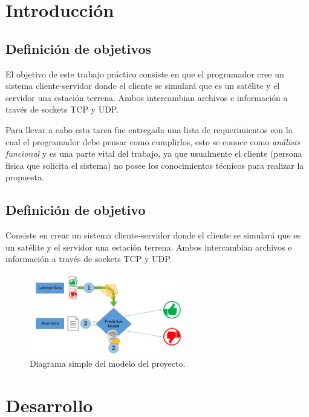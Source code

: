 \documentclass[14.5pt,a4paper]{article}
\begin{document}
\tableofcontents

\clearpage

\section{Introducción}

\subsection{Definición de objetivos}
El objetivo de este trabajo práctico consiste en que el programador cree un sistema cliente-servidor donde el cliente se simulará que es un satélite y el servidor una estación terrena. Ambos intercambian archivos e información a través de sockets TCP y UDP.

Para llevar a cabo esta tarea fue entregada una lista de requerimientos con la cual el programador debe pensar como cumplirlos, esto se conoce como \textit{análisis funcional} y es una parte vital del trabajo, ya que usualmente el cliente (persona física que solicita el sistema) no posee los conocimientos técnicos para realizar la propuesta.

\subsection{Definición de objetivo}
Consiste en crear un sistema cliente-servidor donde el cliente se simulará que es un satélite y el servidor una estación terrena. Ambos intercambian archivos e información a través de sockets TCP y UDP.

\begin{figure}[H]
	\begin{center}				
	\includegraphics[width=0.6\textwidth]{ml_process_diagram.png}
  	\caption{Diagrama simple del modelo del proyecto.}
  	\end{center}
\end{figure}

\section{Desarrollo}
\end{document}
